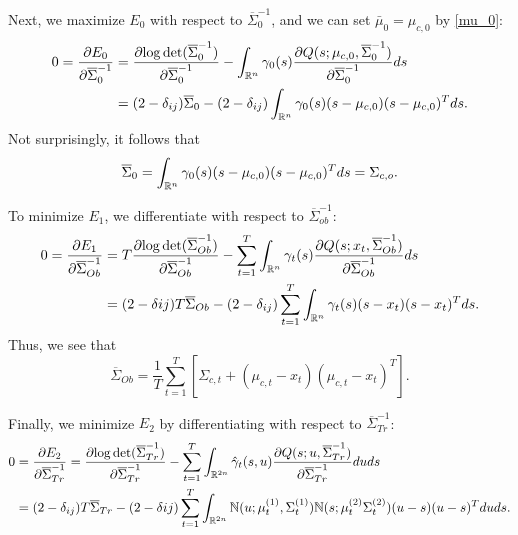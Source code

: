 \documentclass[12pt,leqno]{article}
\begin{document}
Next, we maximize $E_0$ with respect to $\overline{\Sigma}_0^{-1}$, and we can set $\bar{\mu}_0 = \mu_{c,0}$ by \eqref{mu_0}:
\begin{align*}
0 = \frac{\partial{E_0}}{\partial{\overline{\Sigma}_0^{-1}}} &= \frac{\partial{\log\det(\overline{\Sigma}_0^{-1})}}{\partial\overline{\Sigma}_0^{-1}} - \int_{{\mathbb R}^n}\gamma_0(s)\frac{\partial{Q(s;\mu_{c,0},\overline{\Sigma}_0^{-1})}}{\partial{\overline{\Sigma}_0^{-1}}}ds \\
&= (2-\delta_{ij})\overline{\Sigma}_0 - (2-\delta_{ij})\int_{{\mathbb R}^n}\gamma_0(s)(s-\mu_{c,0})(s-\mu_{c,0})^Tds.
\end{align*}
Not surprisingly, it follows that
\begin{equation}\label{Sigma_0}
  \overline{\Sigma}_0 = \int_{{\mathbb R}^n}\gamma_0(s)(s-\mu_{c,0})(s-\mu_{c,0})^Tds = \Sigma_{c,o}.
  \end{equation}

To minimize $E_1$, we differentiate with respect to $\overline{\Sigma}_{ob}^{-1}$:
\begin{align*}
  0 = \frac{\partial{E_1}}{\partial{\overline{\Sigma}_{Ob}^{-1}}} &= T\frac{\partial{\log\det(\overline{\Sigma}_{Ob}^{-1})}}{\partial\overline{\Sigma}_{Ob}^{-1}}
  - \sum_{t=1}^T\int_{{\mathbb R}^n}\gamma_t(s)\frac{\partial{Q(s;x_t,\overline{\Sigma}_{Ob}^{-1})}}{\partial{\overline{\Sigma}_{Ob}^{-1}}}ds \\
  &= (2-\delta{ij})T\overline{\Sigma}_{Ob} - (2-\delta_{ij})\sum_{t=1}^T\int_{{\mathbb R}^n}\gamma_t(s)(s-x_t)(s-x_t)^Tds.
\end{align*}
Thus,  we see that
\begin{equation}\label{Sigma_Ob}
  \overline{\Sigma}_{Ob} = \frac{1}{T}\sum_{t=1}^T [\Sigma_{c,t} + (\mu_{c,t}-x_t)(\mu_{c,t}-x_t)^T].
\end{equation}

Finally, we minimize $E_2$ by differentiating with respect to $\overline{\Sigma}_{Tr}^{-1}$:
\begin{equation}\label{Sigma_Tr:0}
  \begin{split}
  0 &= \frac{\partial{E_2}}{\partial{\overline{\Sigma}_{Tr}^{-1}}} = \frac{\partial{\log\det(\overline{\Sigma}_{Tr}^{-1})}}{\partial\overline{\Sigma}_{Tr}^{-1}}
  - \sum_{t=1}^T\int_{{\mathbb R}^{2n}}\hat{\gamma}_t(s,u)\frac{\partial{Q(s;u,\overline{\Sigma}_{Tr}^{-1})}}{\partial\overline{\Sigma}_{Tr}^{-1}}duds \\
      &= (2-\delta_{ij})T\overline{\Sigma}_{Tr} - (2-\delta{ij}) \sum_{t=1}^T\int_{{\mathbb R}^{2n}}{\mathbb N}(u;\mu^{(1)}_t,\Sigma^{(1)}_t){\mathbb N}(s;\mu^{(2)}_t\Sigma^{(2)}_t)(u-s)(u-s)^Tduds.
  \end{split}
\end{equation}
\end{document}

